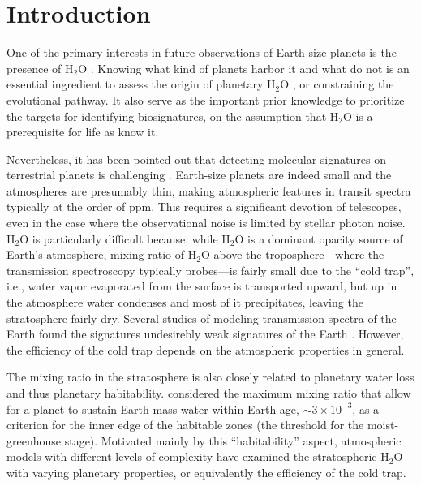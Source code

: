 \documentclass[11pt,numberedappendix,twocolappendix,]{emulateapj}
\def\water{H$_2$O }
\begin{document}

\section{Introduction}
\label{s:intro}

One of the primary interests in future observations of Earth-size planets is the presence of \water. 
Knowing what kind of planets harbor it and what do not is an essential ingredient to assess the origin of planetary \water, or constraining the evolutional pathway. 
It also serve as the important prior knowledge to prioritize the targets for identifying biosignatures, on the assumption that \water is a prerequisite for life as know it. 

Nevertheless, it has been pointed out that detecting molecular signatures on terrestrial planets is challenging \citep{Cowan2015}. 
Earth-size planets are indeed small and the atmospheres are presumably thin, making atmospheric features in transit spectra typically at the order of ppm. 
This requires a significant devotion of telescopes, even in the case where the observational noise is limited by stellar photon noise. 
\water is particularly difficult because, while \water is a dominant opacity source of Earth's atmosphere, mixing ratio of \water above the troposphere---where the transmission spectroscopy typically probes---is fairly small due to the ``cold trap'', i.e., water vapor evaporated from the surface is transported upward, but up in the atmosphere water condenses and most of it precipitates, leaving the stratosphere fairly dry. 
Several studies of modeling transmission spectra of the Earth found the signatures undesirebly weak signatures of the Earth \citep[e.g.,][]{Ehrenreich2006, Kaltenegger2009, Betremieux2013, Misra2014}. 
However, the efficiency of the cold trap depends on the atmospheric properties in general. 

The mixing ratio in the stratosphere is also closely related to planetary water loss and thus planetary habitability. 
\citet{Kasting1993} considered the maximum mixing ratio that allow for a planet to sustain Earth-mass water within Earth age, $\sim 3 \times 10^{-3}$, as a criterion for the inner edge of the habitable zones (the threshold for the moist-greenhouse stage). 
Motivated mainly by this ``habitability'' aspect, atmospheric models with different levels of complexity have examined the stratospheric \water with varying planetary properties, or equivalently the efficiency of the cold trap. 
\end{document}
